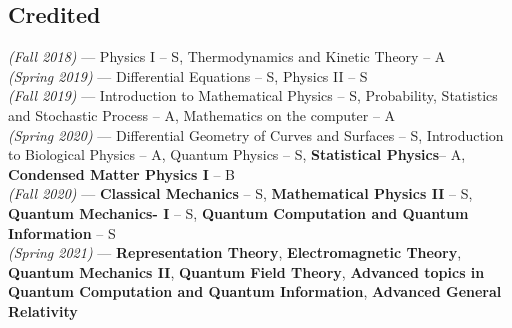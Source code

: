 \documentclass[11pt, a4paper]{article}
\begin{document}
\subsection{\large Credited}
\hspace{0.01\linewidth}
\parbox{0.88\linewidth}{
    {\textit{(Fall 2018)} --- \small Physics I -- S\footnotemark[4], Thermodynamics and Kinetic Theory -- A} \\
    {\textit{(Spring 2019)} --- \small Differential Equations -- S, Physics II -- S} \\
    {\textit{(Fall 2019)} --- \small Introduction to Mathematical Physics -- S, Probability, Statistics and Stochastic Process -- A, Mathematics on the computer -- A} \\
    {\textit{(Spring 2020)} --- \small Differential Geometry of Curves and Surfaces -- S, Introduction to Biological Physics -- A, Quantum Physics -- S, \textbf{Statistical Physics}\footnotemark[5] -- A, \textbf{Condensed Matter Physics I} -- B} \\
    {\textit{(Fall 2020)} --- \small \textbf{Classical Mechanics} -- S, \textbf{Mathematical Physics II} -- S, \textbf{Quantum Mechanics- I} -- S, \textbf{Quantum Computation and Quantum Information} -- S} \\
    {\textit{(Spring 2021)} --- \small \textbf{Representation Theory}, \textbf{Electromagnetic Theory}, \textbf{Quantum Mechanics II}, \textbf{Quantum Field Theory}, \textbf{Advanced topics in Quantum Computation and Quantum Information}, \textbf{Advanced General Relativity}}
}

\end{document}
